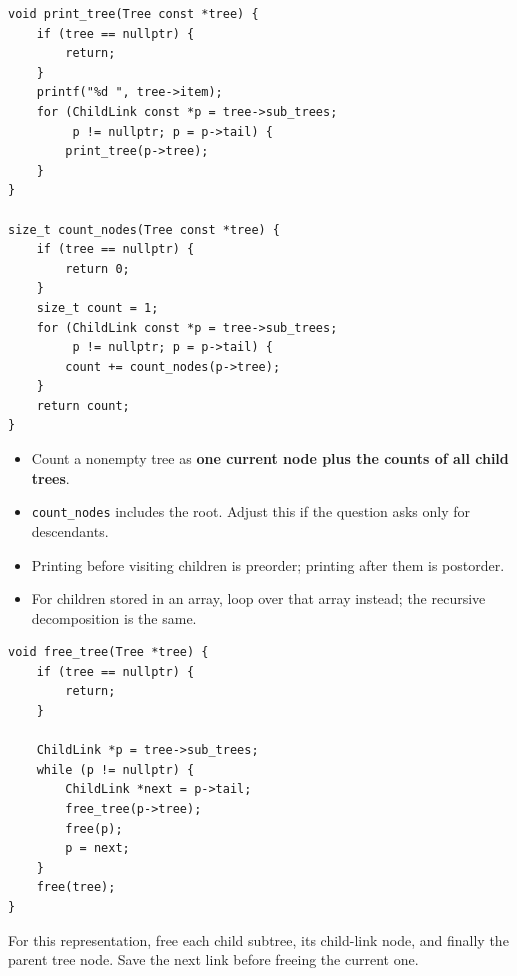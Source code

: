 \documentclass[11pt,a4paper]{article}
\providecommand{\tightlist}{\setlength{\itemsep}{0pt}\setlength{\parskip}{0pt}}
\begin{document}
\label{traversing-and-counting}
\hypertarget{traversing-and-counting}{}

\begin{lstlisting}[style=cscode]
void print_tree(Tree const *tree) {
    if (tree == nullptr) {
        return;
    }
    printf("%d ", tree->item);
    for (ChildLink const *p = tree->sub_trees;
         p != nullptr; p = p->tail) {
        print_tree(p->tree);
    }
}

size_t count_nodes(Tree const *tree) {
    if (tree == nullptr) {
        return 0;
    }
    size_t count = 1;
    for (ChildLink const *p = tree->sub_trees;
         p != nullptr; p = p->tail) {
        count += count_nodes(p->tree);
    }
    return count;
}
\end{lstlisting}

\begin{itemize}
\tightlist
\item
  Count a nonempty tree as \textbf{one current node plus the counts of all child trees}.
\item
  \texttt{count\_nodes} includes the root. Adjust this if the question asks only for descendants.
\item
  Printing before visiting children is preorder; printing after them is postorder.
\item
  For children stored in an array, loop over that array instead; the recursive decomposition is the same.
\end{itemize}

\label{freeing-an-owned-tree}
\hypertarget{freeing-an-owned-tree}{}

\begin{lstlisting}[style=cscode]
void free_tree(Tree *tree) {
    if (tree == nullptr) {
        return;
    }

    ChildLink *p = tree->sub_trees;
    while (p != nullptr) {
        ChildLink *next = p->tail;
        free_tree(p->tree);
        free(p);
        p = next;
    }
    free(tree);
}
\end{lstlisting}

For this representation, free each child subtree, its child-link node, and finally the parent tree node. Save the next link before freeing the current one.

\label{planning-recursive-functions}
\hypertarget{planning-recursive-functions}{}
\end{document}
